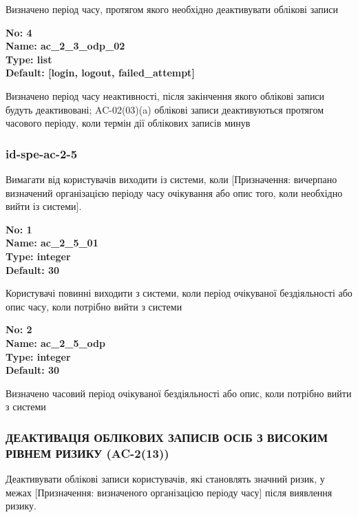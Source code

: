 \documentclass{article}
\begin{document}
{\footnotesize Визначено період часу, протягом якого необхідно деактивувати облікові записи}


{\footnotesize\bfseries
No: 4\\
Name: ac\_\allowbreak{}2\_\allowbreak{}3\_\allowbreak{}odp\_\allowbreak{}02\\
Type: list\\
Default: [\textquotedbl{}login\textquotedbl{}, \textquotedbl{}logout\textquotedbl{}, \textquotedbl{}failed\_\allowbreak{}attempt\textquotedbl{}]
}

{\footnotesize Визначено період часу неактивності, після закінчення якого облікові записи будуть деактивовані; AC-02(03)(a) облікові записи деактивуються протягом часового періоду, коли термін дії облікових записів минув}




\subsubsection{id-spe-ac-2-5}
Вимагати від користувачів виходити із системи, коли [Призначення: вичерпано визначений організацією періоду часу очікування або опис того, коли необхідно вийти із системи].

\vspace{10pt}
{\footnotesize\bfseries
No: 1\\
Name: ac\_\allowbreak{}2\_\allowbreak{}5\_\allowbreak{}01\\
Type: integer\\
Default: 30
}

{\footnotesize Користувачі повинні виходити з системи, коли період очікуваної бездіяльності або опис часу, коли потрібно вийти з системи}


{\footnotesize\bfseries
No: 2\\
Name: ac\_\allowbreak{}2\_\allowbreak{}5\_\allowbreak{}odp\\
Type: integer\\
Default: 30
}

{\footnotesize Визначено часовий період очікуваної бездіяльності або опис, коли потрібно вийти з системи}




\subsubsection{ДЕАКТИВАЦІЯ ОБЛІКОВИХ ЗАПИСІВ ОСІБ З ВИСОКИМ РІВНЕМ РИЗИКУ (AC-2(13))}
Деактивувати облікові записи користувачів, які становлять значний ризик, у межах [Призначення: визначеного організацією періоду часу] після виявлення ризику.
\end{document}

